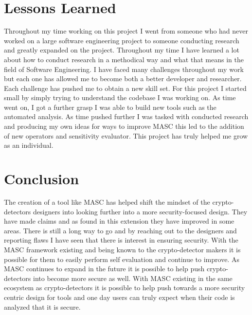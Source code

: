\section{Lessons Learned}
\label{ch6:sec:lessons}

Throughout my time working on this project I went from someone who had never worked on a large software engineering project to someone conducting research and greatly expanded on the project. Throughout my time I have learned a lot about how to conduct research in a methodical way and what that means in the field of Software Engineering. I have faced many challenges throughout my work but each one has allowed me to become both a better developer and researcher. Each challenge has pushed me to obtain a new skill set. For this project I started small by simply trying to understand the codebase I was working on. As time went on, I got a further grasp I was able to build new tools such as the automated analysis. As time pushed further I was tasked with conducted research and producing my own ideas for ways to improve MASC this led to the addition of new operators and sensitivity evaluator. This project has truly helped me grow as an individual.

\section{Conclusion}
\label{ch6:sec:conclusion}

The creation of a tool like MASC has helped shift the mindset of the crypto-detectors designers into looking further into a more security-focused design. They have made claims and as found in this extension they have improved in some areas. There is still a long way to go and by reaching out to the designers and reporting flaws I have seen that there is interest in ensuring security. With the MASC framework existing and being known to the crypto-detector makers it is possible for them to easily perform self evaluation and continue to improve. As MASC continues to expand in the future it is possible to help push crypto-detectors into become more secure as well. With MASC existing in the same ecosystem as crypto-detectors it is possible to help push towards a more security centric design for tools and one day users can truly expect when their code is analyzed that it is secure.